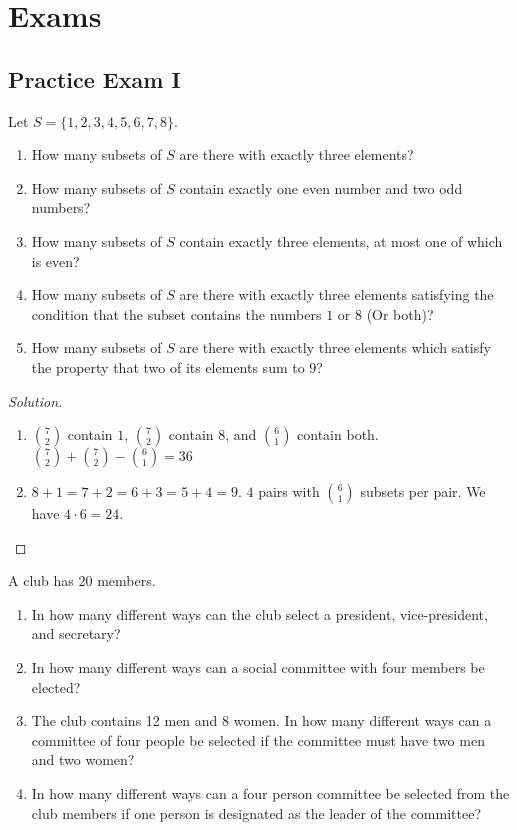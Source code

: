 \documentclass[crop=false,class=book,oneside]{standalone}
\begin{document}
    \section{Exams}
    \subsection{Practice Exam I}
    \begin{problem}
    Let $S = \{1,2,3,4,5,6,7,8\}$.
    \begin{enumerate}
        \item How many subsets of $S$ are there with exactly three elements?
        \item How many subsets of $S$ contain exactly one even number and two odd numbers?
        \item How many subsets of $S$ contain exactly three elements, at most one of which is even?
        \item How many subsets of $S$ are there with exactly three elements satisfying the condition that the subset contains the numbers $1$ or $8$ (Or both)?
        \item How many subsets of $S$ are there with exactly three elements which satisfy the property that two of its elements sum to $9$?
    \end{enumerate}
    \end{problem}
    \begin{proof}[Solution]
    \
    \begin{enumerate}
    \begin{multicols}{3}
        \item $\binom{8}{3} = \frac{8!}{3!(8-3)!} = 56$
        \item $\binom{4}{1}\binom{4}{2} = 24$
        \item $\binom{4}{1} \binom{4}{2} + \binom{4}{0} \binom{4}{3} = 28$.
    \end{multicols}
        \item $\binom{7}{2}$ contain $1$, $\binom{7}{2}$ contain $8$, and $\binom{6}{1}$ contain both. $\binom{7}{2}+\binom{7}{2}-\binom{6}{1}=36$
        \item $8+1=7+2=6+3=5+4=9$. $4$ pairs with $\binom{6}{1}$ subsets per pair. We have $4\cdot 6 = 24$.
    \end{enumerate}
    \end{proof}
    \begin{problem}
    A club has $20$ members.
    \begin{enumerate}
        \item In how many different ways can the club select a president, vice-president, and secretary?
        \item In how many different ways can a social committee with four members be elected?
        \item The club contains 12 men and 8 women. In how many different ways can a committee of four people be selected if the committee must have two men and two women?
        \item In how many different ways can a four person committee be selected from the club members if one person is designated as the leader of the committee?
    \end{enumerate}
    \end{problem}
\end{document}
